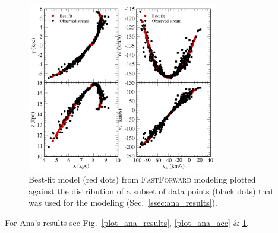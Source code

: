 \begin{figure}
\includegraphics[width=83mm]{./figures/ana_model.png}
  \caption{Best-fit model (red dots) from \textsc{FastForward} modeling plotted against the distribution of a subset of data points (black dots) that was used for the modeling (Sec.~\ref{ssec:ana_results}).}
  \label{plot_ana_model}
\end{figure}

For Ana's results see Fig.~\ref{plot_ana_results}, \ref{plot_ana_acc} \& \ref{plot_ana_model}.
